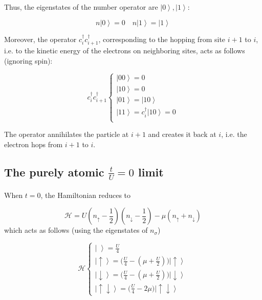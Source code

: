 \documentclass[10pt, twocolumn, twoside]{article}
\begin{document}
Thus, the eigenstates of the number operator are $\left| 0 \right\rangle, \left| 1 \right\rangle$:

\begin{equation}
n \left| 0 \right\rangle = 0 \quad n \left| 1 \right\rangle = \left| 1 \right\rangle
\end{equation}

Moreover, the operator $c_i^\dagger c_{i+1}^\dagger$, corresponding to the hopping from site $i+1$ to $i$, i.e. to the kinetic energy of the electrons on neighboring sites, acts as follows (ignoring spin):

\begin{equation}
c_i^\dagger c_{i+1}^\dagger \begin{cases}
\left|0 0 \right\rangle = 0 \\
\left|1 0 \right\rangle =  0 \\
\left|0 1 \right\rangle =  \left| 1 0 \right\rangle \\
\left|1 1 \right\rangle =  c_i^\dagger \left| 1 0  \right\rangle = 0 \\
\end{cases}
\end{equation}

The operator annihilates the particle at $i+1$ and creates it back at $i$, i.e. the electron hops from $i+1$ to $i$.

\subsection{The purely atomic $\frac{t}{U} = 0$ limit}\paragraph{}

When $t = 0$, the Hamiltonian reduces to 

\begin{equation}
\mathcal{H} = U (n_\uparrow - \frac{1}{2} ) (n_\downarrow - \frac{1}{2} ) - \mu ( n_\uparrow + n_\downarrow )
\end{equation}
which acts as follows (using the eigenstates of $n_\sigma$)

\begin{equation}
\mathcal{H} \begin{cases}
\left| \,\, \right\rangle = \frac{U}{4} \\
\left| \uparrow \right\rangle = \bigg( \frac{U}{4} - (\mu + \frac{U}{2} ) \bigg) \left| \uparrow \right\rangle \\
\left| \downarrow \right\rangle = \bigg( \frac{U}{4} - (\mu + \frac{U}{2} ) \bigg) \left| \downarrow \right\rangle \\
\left| \uparrow \downarrow \right\rangle = \bigg( \frac{U}{4} - 2 \mu \bigg) \left| \uparrow \downarrow \right\rangle
\end{cases}
\end{equation}
\end{document}
